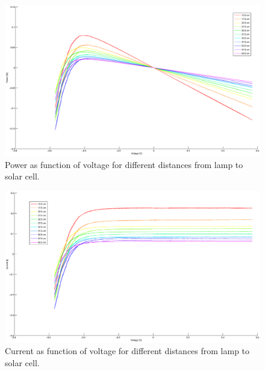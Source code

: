 \documentclass[a4paper]{article}
\begin{document}
\begin{figure}[h!]
  \begin{center}
    \includegraphics[scale=0.25]{PvsV.eps}
  \end{center}
  \caption{Power as function of voltage for different distances from lamp to solar cell.}
  \label{pvsv}
\end{figure}

\begin{figure}[h!]
  \begin{center}
    \includegraphics[scale=0.25]{IvsU.eps}
  \end{center}
  \caption{Current as function of voltage for different distances from lamp to solar cell.}
  \label{ivsu}
\end{figure}
\end{document}
